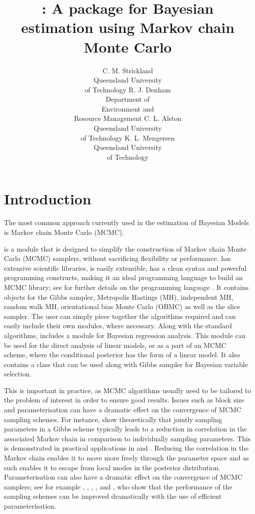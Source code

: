 \documentclass[article]{jss}
\author{C. M. Strickland\\Queensland University\\ of Technology \And 
        R. J. Denham\\Department of \\Environment and\\ Resource Management \And
        C. L. Alston\\Queensland University\\ of Technology \And 
        K. L. Mengersen\\Queensland University\\ of Technology}
\title{\pkg{PyMCMC}: A \proglang{Python} package for Bayesian estimation using Markov chain Monte Carlo}
\begin{document}
\section{Introduction}

The most common approach currently used in the estimation of Bayesian
Models is Markov chain Monte Carlo (MCMC). 

 is a  module that is designed to simplify the construction
of Markov chain Monte Carlo (MCMC) samplers, without sacrificing flexibility
or performance.  has extensive scientific libraries, is easily
extensible, has a clean syntax and powerful programming constructs,
making it an ideal programming language to build an MCMC library;
see \citet{Python} for further details on the programming language
. It contains objects for the Gibbs sampler, Metropolis Hastings
(MH), independent MH, random walk MH, orientational bias Monte Carlo
(OBMC) as well as the slice sampler. The user can simply piece together
the algorithms required and can easily include their own modules,
where necessary. Along with the standard algorithms,  includes
a module for Bayesian regression analysis. This module can be used
for the direct analysis of linear models, or as a part of an MCMC
scheme, where the conditional posterior has the form of a linear model.
It also contains a class that can be used along with Gibbs sampler
for Bayesian variable selection.

This is important in practice, as MCMC algorithms usually need to
be tailored to the problem of interest in order to ensure good results.
Issues such as block size and parameterisation can have a dramatic
effect on the convergence of MCMC sampling schemes. For instance,
\citet{LuiKongWong1994} show theoretically that jointly sampling
parameters in a Gibbs scheme typically leads to a reduction in correlation
in the associated Markov chain in comparison to individually sampling
parameters. This is demonstrated in practical applications in \citet{CarterKohn1994}
and \citet{KimShephardChib1998}. Reducing the correlation in the
Markov chain enables it to move more freely through the parameter
space and as such enables it to escape from local modes in the posterior
distribution. Parameterisation can also have a dramatic effect on
the convergence of MCMC samplers; see for example \citet{GelfandSahuCarlin1995},
\citet{RobersSahu1997}, \citet{PittShepard1999}, \citet{RobertMengersen1999},
\citet{FruwirthSchnatter2004} and \citet{StricklandMartinForbes2008},
who show that the performance of the sampling schemes can be improved
dramatically with the use of efficient parameterisation.
\end{document}
